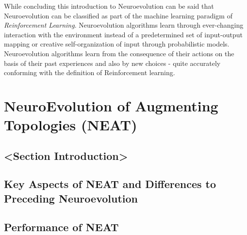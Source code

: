 \documentclass[journal, a4paper]{IEEEtran}
\begin{document}
While concluding this introduction to Neuroevolution can be said that Neuroevolution can be classified as part of the machine learning paradigm of \textit{Reinforcement Learning}. Neuroevolution algorithms learn through ever-changing interaction with the environment instead of a predetermined set of input-output mapping or creative self-organization of input through probabilistic models. Neuroevolution algorithms learn from the consequence of their actions on the basis of their past experiences and also by new choices - quite accurately conforming with the definition of Reinforcement learning.












\section{NeuroEvolution of Augmenting Topologies (NEAT)}

\subsection{<Section Introduction>}

\subsection{Key Aspects of NEAT and Differences to Preceding Neuroevolution}

\subsection{Performance of NEAT}
    
\end{document}
